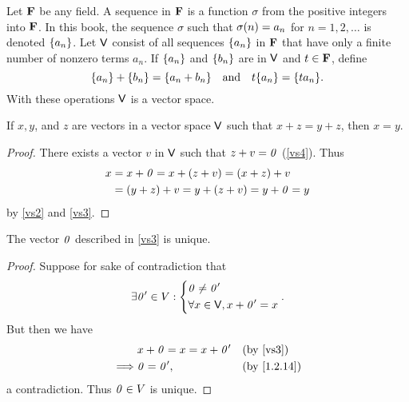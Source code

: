 \begin{eg}\label{1.2.13}
    Let \(\mathbf{F}\) be any field.
    A sequence in \(\mathbf{F}\) is a function \(\sigma\) from the positive integers into \(\mathbf{F}\).
    In this book, the sequence \(\sigma\) such that \(\sigma\p{n} = a_{n}\) for \(n = 1, 2, \dots\) is denoted \(\left\lbrace a_{n}\right\rbrace\).
    Let \(\mathsf{V}\) consist of all sequences \(\left\lbrace a_{n}\right\rbrace\) in \(\mathbf{F}\) that have only a finite number of nonzero terms \(a_{n}\).
    If \(\left\lbrace a_{n}\right\rbrace\) and \(\left\lbrace b_{n}\right\rbrace\) are in \(\mathsf{V}\) and \(t \in \mathbf{F}\), define
    \[
        \set{a_{n}} + \set{b_{n}} = \set{a_{n} + b_{n}} \quad \text{and} \quad t\set{a_{n}} = \set{ta_{n}}.
    \]
    With these operations \(\mathsf{V}\) is a vector space.
\end{eg}

\begin{thm}\label{1.2.14}
    If \(x, y\), and \(z\) are vectors in a vector space \(\mathsf{V}\) such that \(x + z = y + z\), then \(x = y\).
\end{thm}

\begin{proof}
    There exists a vector \(v\) in \(\mathsf{V}\) such that \(z + v = \mathit{0}\) (\ref{vs4}).
    Thus
    \begin{align*}
        x & = x + \mathit{0} = x + \left\lparen z + v\right\rparen = \left\lparen x + z\right\rparen + v     \\
          & = \left\lparen y + z\right\rparen + v = y + \left\lparen z + v\right\rparen = y + \mathit{0} = y
    \end{align*}
    by \ref{vs2} and \ref{vs3}.
\end{proof}

\begin{cor}\label{1.2.15}
    The vector \(\mathit{0}\) described in \ref{vs3} is unique.
\end{cor}

\begin{proof}
    Suppose for sake of contradiction that
    \[
        \exists \mathit{0}' \in V : \begin{dcases}
            \mathit{0} \neq \mathit{0}' \\
            \forall x \in \mathsf{V}, x + \mathit{0}' = x
        \end{dcases}.
    \]
    But then we have
    \begin{align*}
                 & x + \zv = x = x + \zv' &  & \text{(by \ref{vs3})}     \\
        \implies & \zv = \zv',            &  & \text{(by \cref{1.2.14})}
    \end{align*}
    a contradiction.
    Thus \(\mathit{0} \in V\) is unique.
\end{proof}


